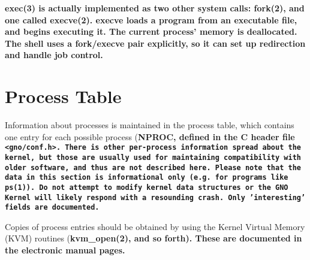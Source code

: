 \documentclass{report}
\begin{document}
\bf exec\rm(3) is actually implemented as
two other system calls: \bf fork\rm(2), and one called \bf execve\rm(2).
\bf execve \rm loads a program from an executable file, and
begins executing it. The current process' memory is deallocated.
The shell uses a \bf fork\rm/\bf execve \rm pair explicitly,
so it can set up redirection and handle job control.


\section{Process Table}

Information about processes is maintained
in the process table, which contains one entry for each possible
process (\bf NPROC\rm, defined in the C header file \tt <gno/conf.h>\rm.
There is other per-process information spread about the kernel, but
those are usually used for maintaining compatibility with older
software, and thus are not described here. Please note that the
data in this section is informational only (e.g. for programs
like \bf ps\rm(1)). Do not attempt to modify kernel data
structures or the GNO Kernel will likely respond with a
resounding crash. Only 'interesting' fields are documented.

Copies of process entries should be
obtained by using the Kernel Virtual Memory (KVM) routines
(\bf kvm\_{}open\rm(2), and so forth).
These are documented in the electronic manual pages.
\end{document}
